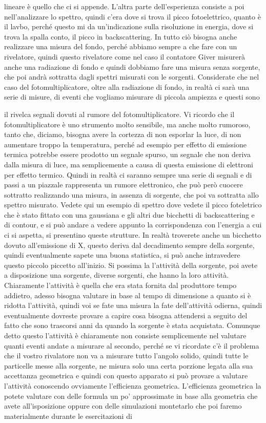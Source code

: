 {lineare è quello che ci si appende. L'altra parte dell'esperienza consiste a poi nell'analizzare lo spettro, quindi c'era dove si trova il picco fotoelettrico, quanto è il lavbo, perché questo mi da un'indicazione sulla risoluzione in energia, dove si trova la spalla conto, il picco in backscattering. In tutto ciò bisogna anche realizzare una misura del fondo, perché abbiamo sempre a che fare con un rivelatore, quindi questo rivelatore come nel caso il contatore Giver misurerà anche una radiazione di fondo e quindi dobbiamo fare una misura senza sorgente, che poi andrà sottratta dagli spettri misurati con le sorgenti. Considerate che nel caso del fotomultiplicatore, oltre alla radiazione di fondo, in realtà ci sarà una serie di misure, di eventi che vogliamo misurare di piccola ampiezza e questi sono 

il rivelca segnali dovuti al rumore del fotomultiplicatore. Vi ricordo che il fotomultiplicatore è uno strumento molto sensibile, ma anche molto rumoroso, tanto che, diciamo, bisogna avere la cortezza di non esporlar la luce, di non aumentare troppo la temperatura, perché ad esempio per effetto di emissione termica potrebbe essere prodotto un segnale spurso, un segnale che non deriva dalla misura di luce, ma semplicemente a causa di questa emissione di elettroni per effetto termico. Quindi in realtà ci saranno sempre una serie di segnali e di passi a un piazzale rappresenta un rumore elettronico, che può però cuocere sottratto realizzando una misura, in assenza di sorgente, che poi va sottratta allo spettro misurato. Vedete qui un esempio di spettro dove vedete il picco foteletrico che è stato fittato con una gaussiana e gli altri due bicchetti di backscattering e di contour, e si può andare a vedere appunto la corrispondenza con l'energia a cui ci si aspetta, si presentino queste strutture. In realtà troverete anche un bicchetto dovuto all'emissione di X, questo deriva dal decadimento sempre della sorgente, quindi eventualmente sapete una buona statistica, si può anche intravedere questo piccolo piccetto all'inizio. Si possima la l'attività della sorgente, poi avete a disposizione una sorgente, diverse sorgenti, che hanno la loro attività. Chiaramente l'attività è quella che era stata fornita dal produttore tempo addietro, adesso bisogna valutare in base al tempo di dimensione a quanto si è ridotta l'attività, quindi voi se fate una misura la fate dell'attività odierna, quindi eventualmente dovreste provare a capire cosa bisogna attendersi a seguito del fatto che sono trascorsi anni da quando la sorgente è stata acquistata. Comunque detto questo l'attività è chiaramente non consiste semplicemente nel valutare quanti eventi andate a misurare al secondo, perché se vi ricordate c'è il problema che il vostro rivalatore non va a misurare tutto l'angolo solido, quindi tutte le particelle messe alla sorgente, ne misura solo una certa porzione legata alla sua accettanza geometrica e quindi con questo apparato si può provare a valutare l'attività conoscendo ovviamente l'efficienza geometrica. L'efficienza geometrica la potete valutare con delle formula un po' approssimate in base alla geometria che avete all'isposizione oppure con delle simulazioni montetarlo che poi faremo materialmente durante le esercitazioni di }
